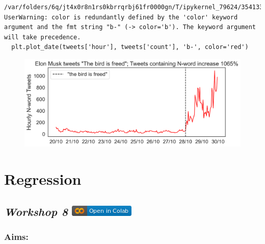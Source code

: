 \documentclass[
  letterpaper,
  DIV=11,
  numbers=noendperiod]{scrreprt}
\begin{document}
\begin{verbatim}
/var/folders/6q/jt4x0r8n1rs0kbrrqrbj61fr0000gn/T/ipykernel_79624/354133693.py:17: UserWarning: color is redundantly defined by the 'color' keyword argument and the fmt string "b-" (-> color='b'). The keyword argument will take precedence.
  plt.plot_date(tweets['hour'], tweets['count'], 'b-', color='red')
\end{verbatim}

\begin{figure}[H]

{\centering \includegraphics{notebooks/W07. Hypothesis Testing_files/figure-pdf/cell-16-output-2.png}

}

\end{figure}


\hypertarget{regression}{%
\chapter{Regression}\label{regression}}

\hypertarget{workshop-8-open-in-colab}{%
\section[\emph{Workshop 8} ]{\texorpdfstring{\emph{Workshop 8}
\href{https://colab.research.google.com/github/oballinger/QM2/blob/main/notebooks/W08.\%20Linear\%20Regression.ipynb}{\protect\includegraphics{index_files/mediabag/colab-badge.png}}}{Workshop 8 Open In Colab}}\label{workshop-8-open-in-colab}}

\hypertarget{aims-5}{%
\subsection{Aims:}\label{aims-5}}
\end{document}
